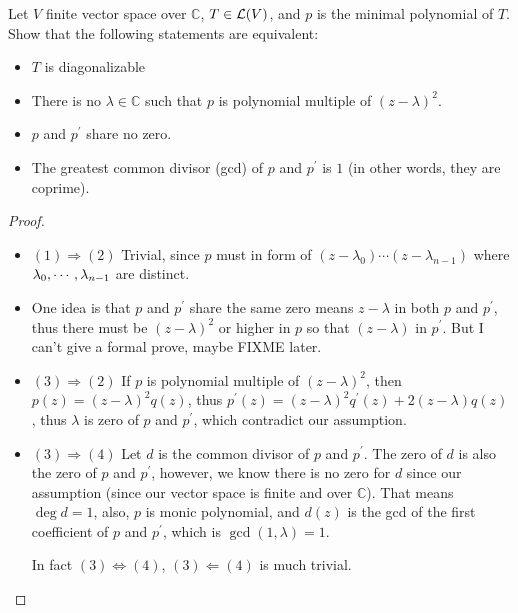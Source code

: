 \documentclass[../main.tex]{subfiles}
\begin{document}
\begin{exercise}
  Let $V$ finite vector space over $\mathbb{C}$, $T \in \mathcal{L}(V)$,
  and $p$ is the minimal polynomial of $T$.
  Show that the following statements are equivalent:
  \begin{itemize}
    \item $T$ is diagonalizable
    \item There is no $\lambda \in \mathbb{C}$ such that $p$ is polynomial multiple of $(z - \lambda)^2$.
    \item $p$ and $p^\prime$ share no zero.
    \item The greatest common divisor (gcd) of $p$ and $p^\prime$ is $1$ (in other words, they are coprime).
  \end{itemize}
\end{exercise}
\begin{proof}
  ~
  \begin{itemize}
    \item $(1) \Rightarrow (2)$ Trivial, since $p$ must in form of $(z - \lambda_0) \cdots (z - \lambda_{n - 1})$ where $\lambda_0 , \cdots , \lambda_{n - 1}$ are distinct.
    \item One idea is that $p$ and $p^\prime$ share the same zero means $z - \lambda$ in both $p$ and $p^\prime$,
          thus there must be $(z - \lambda)^2$ or higher in $p$ so that $(z - \lambda)$ in $p^\prime$.
          But I can't give a formal prove, maybe FIXME later.
    \item $(3) \Rightarrow (2)$ If $p$ is polynomial multiple of $(z - \lambda)^2$, then $p(z) = (z - \lambda)^2q(z)$,
          thus $p^\prime(z) = (z - \lambda)^2q^\prime(z) + 2(z - \lambda)q(z)$, thus $\lambda$ is zero of $p$ and $p^\prime$,
          which contradict our assumption.
    \item $(3) \Rightarrow (4)$ Let $d$ is the common divisor of $p$ and $p^\prime$.
          The zero of $d$ is also the zero of $p$ and $p^\prime$, however,
          we know there is no zero for $d$ since our assumption (since our vector space is finite and over $\mathbb{C}$).
          That means $\deg d = 1$, also, $p$ is monic polynomial, and $d(z)$ is the gcd of
          the first coefficient of $p$ and $p^\prime$, which is $\gcd(1, \lambda) = 1$.

          In fact $(3) \iff (4)$, $(3) \Leftarrow (4)$ is much trivial.
  \end{itemize}
\end{proof}
\end{document}
